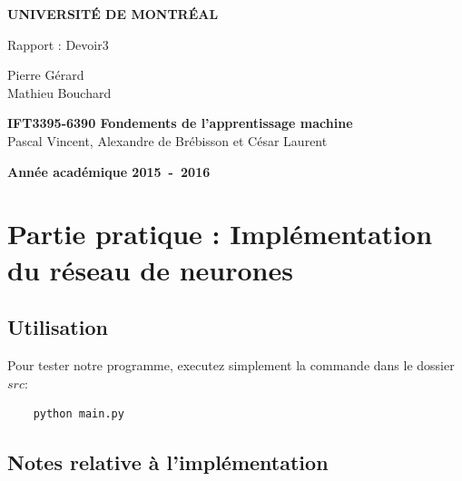 \documentclass[a4paper,11pt]{article}
\begin{document}
\begin{titlepage}
\begin{center}
\textbf{\textsc{UNIVERSIT\'E DE MONTR\'EAL}}\\
\vfill{}\vfill{}
\begin{center}{\Huge Rapport : Devoir3 }\end{center}{\Huge \par}
\begin{center}{\large Pierre Gérard \\ Mathieu Bouchard}\end{center}{\Huge \par}
\vfill{}\vfill{} \vfill{}
\begin{center}{\large \textbf{IFT3395-6390 Fondements de l'apprentissage machine}}\hfill{\\Pascal Vincent, Alexandre de Brébisson et César Laurent}\end{center}{\large\par}
\vfill{}\vfill{}\enlargethispage{3cm}
\textbf{Année académique 2015~-~2016}
\end{center}
\end{titlepage}





\section{Partie pratique : Implémentation du réseau de neurones}

\subsection{Utilisation}

Pour tester notre programme, executez simplement la commande dans le dossier $src$:

\begin{verbatim}
	python main.py
\end{verbatim}

\subsection{Notes relative à l'implémentation}
\end{document}
